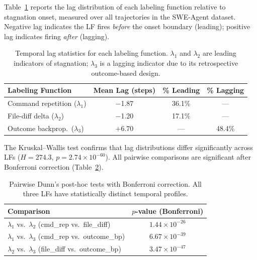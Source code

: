 Table~\ref{tab:lf_lag} reports the lag distribution of each labeling function relative to stagnation onset, measured over all trajectories in the SWE-Agent dataset.
Negative lag indicates the LF fires \emph{before} the onset boundary (leading); positive lag indicates firing \emph{after} (lagging).

\begin{table}[h]
\centering
\small
\begin{tabular}{lccc}
\toprule
\textbf{Labeling Function} & \textbf{Mean Lag (steps)} & \textbf{\% Leading} & \textbf{\% Lagging} \\
\midrule
Command repetition ($\lambda_1$) & $-$1.87 & 36.1\% & --- \\
File-diff delta ($\lambda_2$) & $-$1.20 & 17.1\% & --- \\
Outcome backprop.\ ($\lambda_3$) & $+$6.70 & --- & 48.4\% \\
\bottomrule
\end{tabular}
\caption{Temporal lag statistics for each labeling function. $\lambda_1$ and $\lambda_2$ are leading indicators of stagnation; $\lambda_3$ is a lagging indicator due to its retrospective outcome-based design.}
\label{tab:lf_lag}
\end{table}

The Kruskal--Wallis test confirms that lag distributions differ significantly across LFs ($H{=}274.3$, $p{=}2.74 \times 10^{-60}$).
All pairwise comparisons are significant after Bonferroni correction (Table~\ref{tab:lf_pairwise}).

\begin{table}[h]
\centering
\small
\begin{tabular}{lc}
\toprule
\textbf{Comparison} & \textbf{$p$-value (Bonferroni)} \\
\midrule
$\lambda_1$ vs.\ $\lambda_2$ (cmd\_rep vs.\ file\_diff) & $1.44 \times 10^{-26}$ \\
$\lambda_1$ vs.\ $\lambda_3$ (cmd\_rep vs.\ outcome\_bp) & $6.67 \times 10^{-39}$ \\
$\lambda_2$ vs.\ $\lambda_3$ (file\_diff vs.\ outcome\_bp) & $3.47 \times 10^{-47}$ \\
\bottomrule
\end{tabular}
\caption{Pairwise Dunn's post-hoc tests with Bonferroni correction. All three LFs have statistically distinct temporal profiles.}
\label{tab:lf_pairwise}
\end{table}

